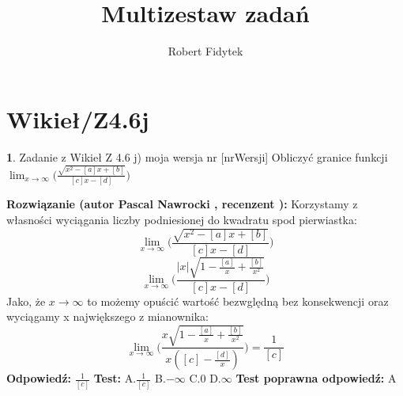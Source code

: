 \documentclass[12pt, a4paper]{article}
\title{Multizestaw zadań}
\author{Robert Fidytek}
\date{}
\theoremstyle{definition} %
\newtheorem{zad}{}
\newcommand{\kategoria}[1]{\section{#1}} %
\newcommand{\zadStart}[1]{\begin{zad}#1\newline} %
\newcommand{\zadStop}{\end{zad}}   %
\newcommand{\rozwStart}[2]{\noindent \textbf{Rozwiązanie (autor #1 , recenzent #2): }\newline} %
\newcommand{\rozwStop}{\newline}                                            %
\newcommand{\odpStart}{\noindent \textbf{Odpowiedź:}\newline}    %
\newcommand{\odpStop}{\newline}                                             %
\newcommand{\testStart}{\noindent \textbf{Test:}\newline} %
\newcommand{\testStop}{\newline} %
\newcommand{\kluczStart}{\noindent \textbf{Test poprawna odpowiedź:}\newline} %
\newcommand{\kluczStop}{\newline} %
\begin{document}
\maketitle


\kategoria{Wikieł/Z4.6j}
\zadStart{Zadanie z Wikieł Z 4.6 j) moja wersja nr [nrWersji]}
Obliczyć granice funkcji $\displaystyle{\lim_{x \to \infty}}\bigg(\frac{\sqrt{x^2-[a]x+[b]}}{[c]x-[d]}\bigg)$
\zadStop
\rozwStart{Pascal Nawrocki}{}
Korzystamy z własności wyciągania liczby podniesionej do kwadratu spod pierwiastka:
$$\displaystyle{\lim_{x \to \infty}}\bigg(\frac{\sqrt{x^2-[a]x+[b]}}{[c]x-[d]}\bigg)$$
$$\displaystyle{\lim_{x \to \infty}}\bigg(\frac{|x|\sqrt{1-\frac{[a]}{x}+\frac{[b]}{x^2}}}{[c]x-[d]}\bigg)$$
Jako, że $x \to \infty$ to możemy opuścić wartość bezwględną bez konsekwencji oraz wyciągamy x największego z mianownika:
$$\displaystyle{\lim_{x \to \infty}}\bigg(\frac{x\sqrt{1-\frac{[a]}{x}+\frac{[b]}{x^2}}}{x([c]-\frac{[d]}{x})}\bigg)=\frac{1}{[c]}$$
\rozwStop
\odpStart
$\frac{1}{[c]}$
\odpStop
\testStart
A.$\frac{1}{[c]}$
B.$-\infty$
C.$0$
D.$\infty$
\testStop
\kluczStart
A
\kluczStop
\end{document}
